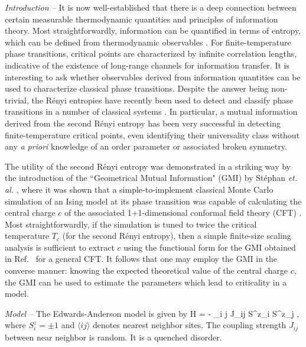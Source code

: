 \documentclass[a4paper,aps,prl,reprint,superscriptaddress,twocolumn,floatfix]{revtex4-1}
\begin{document}
{\em Introduction --}
It is now well-established that there is a deep connection between certain measurable thermodynamic quantities
and principles of information theory.  
Most straightforwardly, information can be quantified in terms of entropy, which can be defined from thermodynamic observables \cite{shannon,cardy}. 
For finite-temperature phase transitions, critical points are characterized by infinite
correlation lengths, indicative of the existence of long-range
channels for information transfer.  
It is interesting to ask whether observables derived from information quantities can be used to characterize
classical phase transitions.
Despite the answer being non-trivial, the R\'enyi entropies have recently been used to 
detect and classify phase transitions in a number of
classical systems \cite{stephen2013,stephan2014,troyer,vidal,Alba1,Alba2,stephen2016,Johannes}.
In particular, a mutual information derived from the second R\'enyi entropy \cite{melko2010,Singh,WL} has been very successful in 
detecting finite-temperature critical points, even identifying their universality class
without any {\it a priori} knowledge of an order parameter or associated broken symmetry.


The utility of the second R\'enyi entropy was demonstrated in a striking way by the introduction of the 
``Geometrical Mutual Information" (GMI) by St\'ephan {\it et. al.} \cite{stephan2014}, where it was shown that a 
simple-to-implement classical Monte Carlo simulation of an Ising model at its phase transition
was capable of calculating the central charge $c$ of the associated 1+1-dimensional conformal field theory (CFT)
\cite{belavin,friedan,wilczek,kitaev,cardy}.
Most straightforwardly, if the simulation is tuned to twice the critical temperature $T_c$ (for the second R\'enyi entropy), then a 
simple finite-size scaling analysis is sufficient to extract $c$ using the functional form for the GMI obtained in
Ref.~\cite{stephan2014} for a general CFT.  
It follows that one may employ the GMI in the converse manner: knowing the expected theoretical value of the central charge $c$,
the GMI can be used to estimate the parameters which lead to criticality in a model.  


{\em Model --}
The Edwards-Anderson model is given by
\beq 
H = - \sum_{\langle i j \rangle} J_{ij} S^z_i S^z_j  ,
\label{EA-model}
\eeq
where $S^z_i = \pm 1 $ and $ \langle i j \rangle $ denotes nearest neighbor sites. The coupling strength $J_{ij}$  between near
neighbor is random. It is a quenched disorder.
\end{document}
